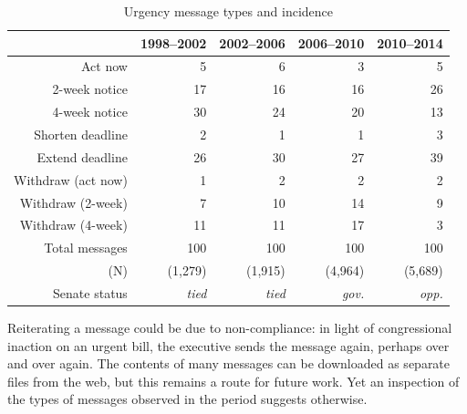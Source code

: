 \documentclass[letter,12pt]{article}
\begin{document}
\begin{table}
\centering
\begin{tabular}{rrrrr}
      & 1998--2002 & 2002--2006 & 2006--2010 & 2010--2014 \\ \hline
 Act now             & 5  & 6  & 3  & 5  \\ 
 2-week notice       & 17 & 16 & 16 & 26 \\ 
 4-week notice       & 30 & 24 & 20 & 13 \\ \hdashline
 Shorten deadline    & 2  & 1  & 1  & 3  \\ 
 Extend deadline     & 26 & 30 & 27 & 39 \\ \hdashline
 Withdraw (act now)  & 1  & 2  & 2  & 2  \\ 
 Withdraw (2-week)   & 7  & 10 & 14 & 9  \\ 
 Withdraw (4-week)   & 11 & 11 & 17 & 3  \\ \hline
 Total messages      & 100 & 100 & 100 & 100 \\ 
(N)                  & (1,279) & (1,915) & (4,964) & (5,689) \\ \hline
 Senate status       & \emph{tied} & \emph{tied} & \emph{gov.} & \emph{opp.} \\
\end{tabular}
\caption{Urgency message types and incidence}
\end{table}


Reiterating a message could be due to non-compliance: in light of congressional inaction on an urgent bill, the executive sends the message again, perhaps over and over again. The contents of many messages can be downloaded as separate files from the web, but this remains a route for future work. Yet an inspection of the types of messages observed in the period suggests otherwise. 
\end{document}
